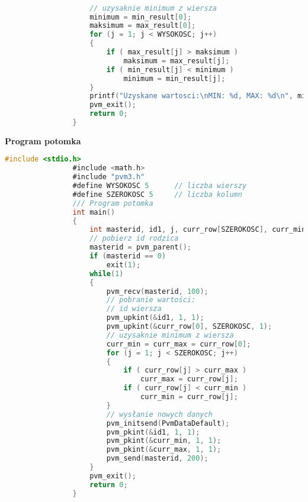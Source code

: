 \begin{lstlisting}[language={C}]
					
					
					
					// uzysaknie minimum z wiersza
					minimum = min_result[0];
					maksimum = max_result[0];
					for (j = 1; j < WYSOKOSC; j++)
					{
						if ( max_result[j] > maksimum )
							maksimum = max_result[j];
						if ( min_result[j] < minimum )
							minimum = min_result[j];
					}
					printf("Uzyskane wartosci:\nMIN: %d, MAX: %d\n", minimum, maksimum);
					pvm_exit();
					return 0;
				}
			\end{lstlisting}
			\textbf{Program potomka}
			\begin{lstlisting}[language={C}]
				#include <stdio.h>
				#include <math.h>
				#include "pvm3.h"
				#define WYSOKOSC 5		// liczba wierszy
				#define SZEROKOSC 5		// liczba kolumn
				/// Program potomka
				int main()
				{
					int masterid, id1, j, curr_row[SZEROKOSC], curr_min, curr_max;
					// pobierz id rodzica 
					masterid = pvm_parent();
					if (masterid == 0)
						exit(1);
					while(1)
					{
						pvm_recv(masterid, 100);
						// pobranie wartości:
						// id wiersza
						pvm_upkint(&id1, 1, 1);
						pvm_upkint(&curr_row[0], SZEROKOSC, 1);
						// uzysaknie minimum z wiersza
						curr_min = curr_max = curr_row[0];
						for (j = 1; j < SZEROKOSC; j++)
						{
							if ( curr_row[j] > curr_max )
								curr_max = curr_row[j];
							if ( curr_row[j] < curr_min )
								curr_min = curr_row[j];
						}
						// wysłanie nowych danych
						pvm_initsend(PvmDataDefault);
						pvm_pkint(&id1, 1, 1);
						pvm_pkint(&curr_min, 1, 1);
						pvm_pkint(&curr_max, 1, 1);
						pvm_send(masterid, 200);
					}
					pvm_exit();
					return 0;
				}
			\end{lstlisting}